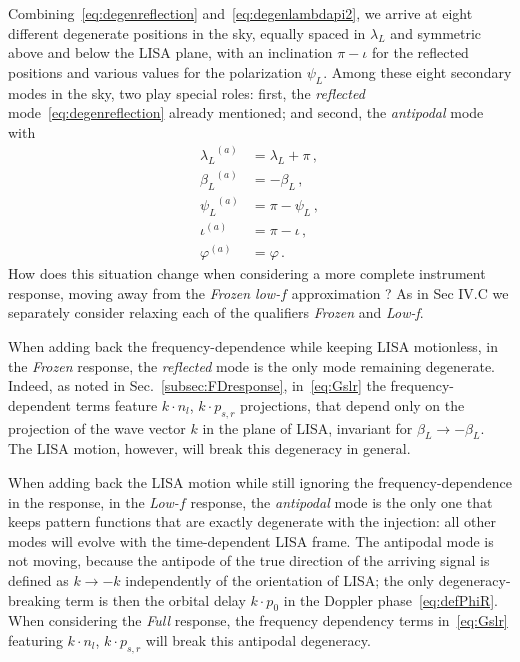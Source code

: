 \documentclass[aps,showpacs,twocolumn,prd,superscriptaddress,nofootinbib]{revtex4-1}
\newcommand{\nn}{\nonumber}
\newcommand\betaL{{\beta_{L}}}
\newcommand\lambdaL{{\lambda_{L}}}
\newcommand\psiL{{\psi_{L}}}
\begin{document}
Combining~\eqref{eq:degenreflection} and~\eqref{eq:degenlambdapi2}, we arrive at eight different degenerate positions in the sky, equally spaced in $\lambdaL$ and symmetric above and below the LISA plane, with an inclination $\pi - \iota$ for the reflected positions and various values for the polarization $\psiL$. Among these eight secondary modes in the sky, two play special roles: first, the \textit{reflected} mode~\eqref{eq:degenreflection} already mentioned; and second, the \textit{antipodal} mode with
\begin{align} \label{eq:degenantipodal}
	\lambdaL^{(a)} &= \lambdaL + \pi \,, \nn \\
	\betaL^{(a)} &= -\betaL \,, \nn \\
	\psiL^{(a)} &= \pi - \psiL \,, \nn \\
	\iota^{(a)} &= \pi - \iota \,, \nn \\
	\varphi^{(a)} &= \varphi \,.
\end{align}
How does this situation change when considering a more complete instrument response, moving away from the \textit{Frozen low-$f$} approximation ? As in Sec IV.C
we separately consider relaxing each of the qualifiers \textit{Frozen} and \textit{Low-f}.

When adding back the frequency-dependence while keeping LISA motionless, in the \textit{Frozen} response, the \textit{reflected} mode is the only mode remaining degenerate. Indeed, as noted in Sec.~\ref{subsec:FDresponse}, in~\eqref{eq:Gslr} the frequency-dependent terms feature $k\cdot n_{l}$, $k \cdot p_{s,r}$ projections, that depend only on the projection of the wave vector $k$ in the plane of LISA, invariant for $\betaL \rightarrow -\betaL$. The LISA motion, however, will break this degeneracy in general.

When adding back the LISA motion while still ignoring the frequency-dependence in the response, in the \textit{Low-$f$} response, the \textit{antipodal} mode is the only one that keeps pattern functions that are exactly degenerate with the injection: all other modes will evolve with the time-dependent LISA frame. The antipodal mode is not moving, because the antipode of the true direction of the arriving signal  is defined as $k \rightarrow -k$ independently of the orientation of LISA; the only degeneracy-breaking term is then the orbital delay $k \cdot p_{0}$ in the Doppler phase~\eqref{eq:defPhiR}. When considering the \textit{Full} response, the frequency dependency terms in~\eqref{eq:Gslr} featuring $k\cdot n_{l}$, $k \cdot p_{s,r}$ will break this antipodal degeneracy.
\end{document}
